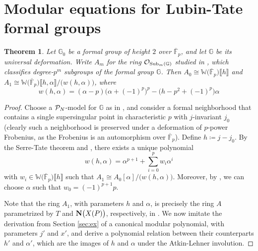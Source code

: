 \documentclass{rs}
\newtheorem{thm}[equation]{Theorem}
\theoremstyle{definition}
\theoremstyle{remark}
\newcommand{\mb}[1]{\mathbb{#1}}
\newcommand{\cF}{\overline {\mb F}}
\newcommand{\CO}{{\cal O}}
\newcommand{\CP}{{\cal P}}
\newcommand{\Sub}{{\rm Sub}}
\newcommand{\BG}{{\mb G}}
\newcommand{\BW}{{\mb W}}
\newcommand{\A}{\alpha}
\newcommand{\ce}{\coloneqq}
\newcommand{\lb}{\llbracket}
\newcommand{\rb}{\rrbracket}
\renewcommand{\=}{\approx}
\renewcommand{\-}{\sim}
\numberwithin{equation}{section}
\begin{document}
\section{Modular equations for Lubin-Tate formal groups}

\begin{thm}
 Let $\BG_0$ be a formal group of height $2$ over $\cF_p$, 
 and let $\BG$ be its universal deformation.  
 Write $A_m$ for the ring $\CO_{\Sub_m(\BG)}$ studied in \cite{Str97}, 
 which classifies degree-$p^m$ subgroups of the formal group $\BG$.  
 Then $A_0 \cong \BW\big(\cF_p\big)\lb h \rb$ and $A_1 \cong \BW\big(\cF_p\big)\lb h, \A \rb / \big(w(h,\A)\big)$, where 
 \[
  w(h,\A) = (\A - p) \big(\A + (-1)^p\big)^p - \big(h - p^2 + (-1)^p\big) \A 
 \]
\end{thm}

\begin{proof}
 Choose a $\CP_N$-model for $\BG$ as in \cite[Section 2]{ho}, 
 and consider a formal neighborhood that contains a single supersingular point in characteristic $p$ with $j$-invariant $j_0$ 
 (clearly such a neighborhood is preserved under a deformation of $p$-power Frobenius, as the Frobenius is an automorphism over $\cF_p$).  
 Define $h \ce j - j_0$.  
 By the Serre-Tate theorem and \cite[Remark 3.2]{ho}, 
 there exists a unique polynomial 
 \begin{equation}
  \label{w}
  w(h,\A) = \A^{p + 1} + \sum_{i = 0}^p w_i \A^i 
 \end{equation}
 with $w_i \in \BW\big(\cF_p\big)\lb h \rb$ such that $A_1 \cong A_0[\A] / \big(w(h,\A)\big)$.  
 Moreover, by \cite[Theorem 4]{Ando95}, we can choose $\A$ such that $w_0 = (-1)^{p + 1} p$.  

 Note that the ring $A_1$, with parameters $h$ and $\A$, 
 is precisely the ring $A$ parametrized by $T$ and ${\bf N}\big(X(P)\big)$, respectively, in \cite[Section 7.7]{KM}.  
 We now imitate the derivation from Section \ref{sec:ex} of a canonical modular polynomial, with parameters $j'$ and $x'$, 
 and derive a polynomial relation between their counterparts $h'$ and $\A'$, 
 which are the images of $h$ and $\A$ under the Atkin-Lehner involution.  


\end{proof}
\end{document}
